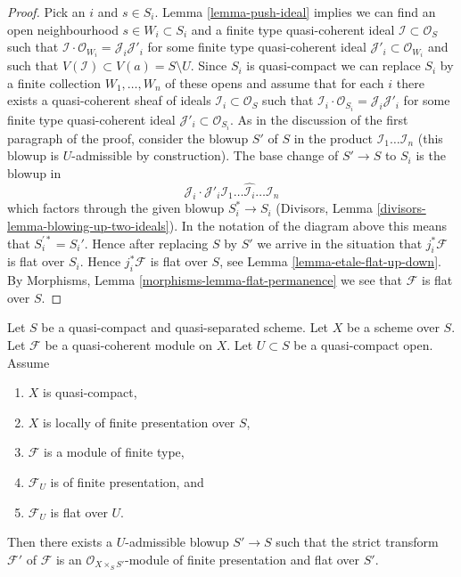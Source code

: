 \begin{proof}
\medskip\noindent
Pick an $i$ and $s \in S_i$. Lemma \ref{lemma-push-ideal}
implies we can find an open neighbourhood $s \in W_i \subset S_i$
and a finite type quasi-coherent ideal $\mathcal{I} \subset \mathcal{O}_S$
such that $\mathcal{I} \cdot \mathcal{O}_{W_i} = \mathcal{J}_i \mathcal{J}'_i$
for some finite type quasi-coherent ideal
$\mathcal{J}'_i \subset \mathcal{O}_{W_i}$
and such that $V(\mathcal{I}) \subset V(a) = S \setminus U$.
Since $S_i$ is quasi-compact we can replace $S_i$ by a finite collection
$W_1, \ldots, W_n$ of these opens and assume that for each $i$ there exists
a quasi-coherent sheaf of ideals $\mathcal{I}_i \subset \mathcal{O}_S$ such
that $\mathcal{I}_i \cdot \mathcal{O}_{S_i} = \mathcal{J}_i \mathcal{J}'_i$
for some finite type quasi-coherent ideal
$\mathcal{J}'_i \subset \mathcal{O}_{S_i}$.
As in the discussion of the first paragraph of the proof, consider the
blowup $S'$ of $S$ in the product $\mathcal{I}_1 \ldots \mathcal{I}_n$
(this blowup is $U$-admissible by construction). The base change of $S' \to S$
to $S_i$ is the blowup in
$$
\mathcal{J}_i \cdot
\mathcal{J}'_i \mathcal{I}_1 \ldots \hat{\mathcal{I}_i} \ldots \mathcal{I}_n
$$
which factors through the given blowup $S_i^* \to S_i$
(Divisors, Lemma \ref{divisors-lemma-blowing-up-two-ideals}). In the notation
of the diagram above this means that $S_i^{\prime *} = S_i'$. Hence
after replacing $S$ by $S'$ we arrive in the situation that
$j_i^*\mathcal{F}$ is flat over $S_i$. Hence $j_i^*\mathcal{F}$ is flat
over $S$, see
Lemma \ref{lemma-etale-flat-up-down}.
By Morphisms, Lemma \ref{morphisms-lemma-flat-permanence}
we see that $\mathcal{F}$ is flat over $S$.
\end{proof}

\begin{theorem}
\label{theorem-flatten-module}
Let $S$ be a quasi-compact and quasi-separated scheme.
Let $X$ be a scheme over $S$.
Let $\mathcal{F}$ be a quasi-coherent module on $X$.
Let $U \subset S$ be a quasi-compact open. Assume
\begin{enumerate}
\item $X$ is quasi-compact,
\item $X$ is locally of finite presentation over $S$,
\item $\mathcal{F}$ is a module of finite type,
\item $\mathcal{F}_U$ is of finite presentation, and
\item $\mathcal{F}_U$ is flat over $U$.
\end{enumerate}
Then there exists a $U$-admissible blowup $S' \to S$ such that the
strict transform $\mathcal{F}'$ of $\mathcal{F}$ is an
$\mathcal{O}_{X \times_S S'}$-module of finite presentation and
flat over $S'$.
\end{theorem}

